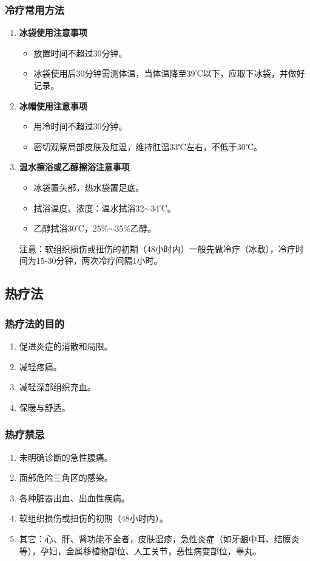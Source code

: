 \documentclass[11pt, a4paper]{ctexart}
\begin{document}
\subsubsection{冷疗常用方法}
\begin{enumerate}
	\item \textbf{冰袋使用注意事项}
	      \begin{itemize}
		      \item 放置时间不超过30分钟。
		      \item 冰袋使用后30分钟需测体温，当体温降至39℃以下，应取下冰袋，并做好记录。
	      \end{itemize}
	\item \textbf{冰帽使用注意事项}
	      \begin{itemize}
		      \item 用冷时间不超过30分钟。
		      \item 密切观察局部皮肤及肛温，维持肛温33℃左右，不低于30℃。
	      \end{itemize}
	\item \textbf{温水擦浴或乙醇擦浴注意事项}
	      \begin{itemize}
		      \item 冰袋置头部，热水袋置足底。
		      \item 拭浴温度、浓度：温水拭浴32$\sim$34℃。
		      \item 乙醇拭浴30℃，25\%$\sim$35\%乙醇。
	      \end{itemize}
	      注意：软组织损伤或扭伤的初期（48小时内）一般先做冷疗（冰敷），冷疗时间为15-30分钟，两次冷疗间隔1小时。
\end{enumerate}

\subsection{热疗法}
\subsubsection{热疗法的目的}
\begin{enumerate}
	\item 促进炎症的消散和局限。
	\item 减轻疼痛。
	\item 减轻深部组织充血。
	\item 保暖与舒适。
\end{enumerate}

\subsubsection{热疗禁忌}
\begin{enumerate}
	\item 未明确诊断的急性腹痛。
	\item 面部危险三角区的感染。
	\item 各种脏器出血、出血性疾病。
	\item 软组织损伤或扭伤的初期（48小时内）。
	\item 其它：心、肝、肾功能不全者，皮肤湿疹，急性炎症（如牙龈中耳、结膜炎等），孕妇，金属移植物部位、人工关节，恶性病变部位，睾丸。
\end{enumerate}
\end{document}
